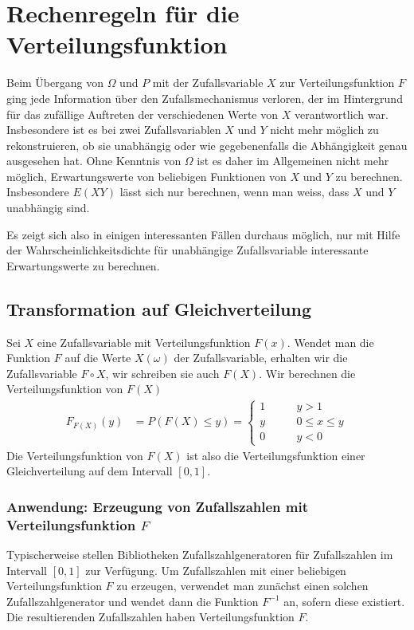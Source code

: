 \section{Rechenregeln für die Verteilungsfunktion}
Beim Übergang von $\Omega$ und $P$ mit
der Zufallsvariable $X$ zur Verteilungsfunktion $F$ 
ging jede Information
über den Zufallsmechanismus verloren, der im Hintergrund für das zufällige
Auftreten der verschiedenen Werte von $X$ verantwortlich war.
Insbesondere
ist es bei zwei Zufallsvariablen $X$ und $Y$ nicht mehr möglich zu
rekonstruieren, ob sie unabhängig oder wie gegebenenfalls die Abhängigkeit
genau ausgesehen hat.
Ohne Kenntnis von $\Omega$ ist es daher im Allgemeinen
nicht mehr möglich, Erwartungswerte von beliebigen Funktionen von $X$ und $Y$
zu berechnen.
Insbesondere $E(XY)$ lässt sich nur berechnen, wenn man weiss,
dass $X$ und $Y$ unabhängig sind.

Es zeigt sich also in einigen interessanten Fällen durchaus möglich, nur mit
Hilfe der Wahrscheinlichkeitsdichte für unabhängige
Zufallsvariable interessante Erwartungswerte zu berechnen.

\subsection{Transformation auf Gleichverteilung}
Sei $X$ eine Zufallsvariable mit Verteilungsfunktion $F(x)$.
Wendet man die Funktion $F$ auf die Werte $X(\omega)$ der Zufallsvariable,
erhalten wir die Zufallsvariable $F\circ X$, wir schreiben sie auch
$F(X)$.
Wir berechnen die Verteilungsfunktion von $F(X)$
\begin{align*}
F_{F(X)}(y)
&=
P(F(X)\le y)
=
\begin{cases}
1&\qquad y > 1\\
y&\qquad 0\le x\le y\\
0&\qquad y < 0
\end{cases}
\end{align*}
Die Verteilungsfunktion von $F(X)$ ist also die Verteilungsfunktion einer
Gleichverteilung auf dem Intervall $[0,1]$.

\subsubsection{Anwendung: Erzeugung von Zufallszahlen mit Verteilungsfunktion \texorpdfstring{$F$}{F}}
Typischerweise stellen Bibliotheken Zufallszahlgeneratoren für Zufallszahlen
im Intervall $[0,1]$ zur Verfügung.
Um Zufallszahlen mit einer beliebigen Verteilungsfunktion $F$ zu erzeugen,
verwendet man zunächst einen solchen Zufallszahlgenerator und wendet dann die
Funktion $F^{-1}$ an, sofern diese existiert.
Die resultierenden Zufallszahlen haben Verteilungsfunktion $F$.

